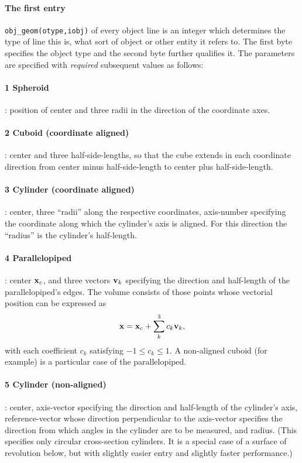 \documentclass[12pt]{article}
\begin{document}
\paragraph{The first entry} 
\verb!obj_geom(otype,iobj)! of every object line is an integer which
determines the type of line this is, what sort of object or other
entity it refers to. The first byte specifies the object type and the
second byte further qualifies it. The parameters are specified with
\emph{required} subsequent values as follows:

\paragraph{1 Spheroid}: position of center and three radii in the
direction of the coordinate axes.

\paragraph{2 Cuboid (coordinate aligned)}: center and three
half-side-lengths, so that the cube extends in each coordinate
direction from center minus half-side-length to center plus
half-side-length.

\paragraph{3 Cylinder (coordinate aligned)}: center, three ``radii''
along the respective coordinates, axis-number specifying the
coordinate along which the cylinder's axis is aligned. For this
direction the ``radius'' is the cylinder's half-length.

\paragraph{4 Parallelopiped}: center ${\bf x}_c$, and three vectors
${\bf v}_k$ specifying the
direction and half-length of the parallelopiped's edges. The volume
consists of those points whose vectorial position can be expressed as
\begin{equation}\label{parallelocoef}
{\bf x} = {\bf x}_c + \sum_k^3 c_k {\bf v}_k,  
\end{equation}
with each coefficient
$c_k$ satisfying $-1\le c_k \le 1$. A non-aligned cuboid (for example)
is a
particular case of the parallelopiped. 

\paragraph{5 Cylinder (non-aligned)}: center, axis-vector specifying the
direction and half-length of the cylinder's axis, reference-vector
whose direction perpendicular to the axis-vector specifies the
direction from which angles in the cylinder are to be measured, and
radius. (This specifies only circular cross-section cylinders. It is a
special case of a surface of revolution below, but with slightly
easier entry and slightly faster performance.)
\end{document}
